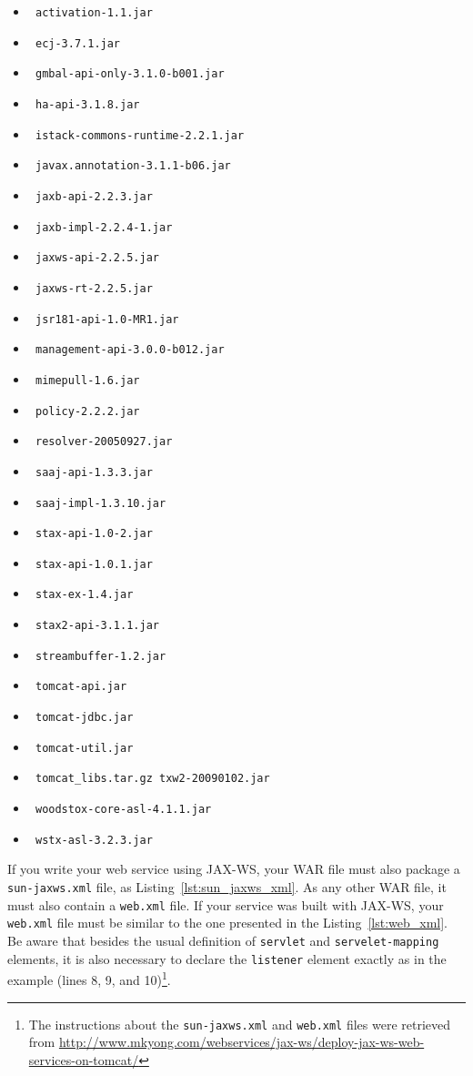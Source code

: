 \documentclass[a4paper, 10pt]{article}
\begin{document}
\begin{itemize}
\item \verb! activation-1.1.jar!
\item \verb! ecj-3.7.1.jar!
\item \verb! gmbal-api-only-3.1.0-b001.jar!
\item \verb! ha-api-3.1.8.jar!
\item \verb! istack-commons-runtime-2.2.1.jar!
\item \verb! javax.annotation-3.1.1-b06.jar!
\item \verb! jaxb-api-2.2.3.jar!
\item \verb! jaxb-impl-2.2.4-1.jar!
\item \verb! jaxws-api-2.2.5.jar!
\item \verb! jaxws-rt-2.2.5.jar!
\item \verb! jsr181-api-1.0-MR1.jar!
\item \verb! management-api-3.0.0-b012.jar!
\item \verb! mimepull-1.6.jar!
\item \verb! policy-2.2.2.jar!
\item \verb! resolver-20050927.jar!
\item \verb! saaj-api-1.3.3.jar!
\item \verb! saaj-impl-1.3.10.jar!
\item \verb! stax-api-1.0-2.jar!
\item \verb! stax-api-1.0.1.jar!
\item \verb! stax-ex-1.4.jar!
\item \verb! stax2-api-3.1.1.jar!
\item \verb! streambuffer-1.2.jar!
\item \verb! tomcat-api.jar!
\item \verb! tomcat-jdbc.jar!
\item \verb! tomcat-util.jar!
\item \verb! tomcat_libs.tar.gz txw2-20090102.jar!
\item \verb! woodstox-core-asl-4.1.1.jar!
\item \verb! wstx-asl-3.2.3.jar!
\end{itemize}


If you write your web service using JAX-WS, your WAR file must also package a \texttt{sun-jaxws.xml} file, as Listing~\ref{lst:sun_jaxws_xml}. As any other WAR file, it must also contain a \texttt{web.xml} file. If your service was built with JAX-WS, your \texttt{web.xml} file must be similar to the one presented in the Listing~\ref{lst:web_xml}. Be aware that besides the usual definition of \texttt{servlet} and \texttt{servelet-mapping} elements, it is also necessary to declare the \texttt{listener} element exactly as in the example (lines 8, 9, and 10)\footnote{The instructions about the \texttt{sun-jaxws.xml} and \texttt{web.xml} files were retrieved from \url{http://www.mkyong.com/webservices/jax-ws/deploy-jax-ws-web-services-on-tomcat/}}.
\end{document}
